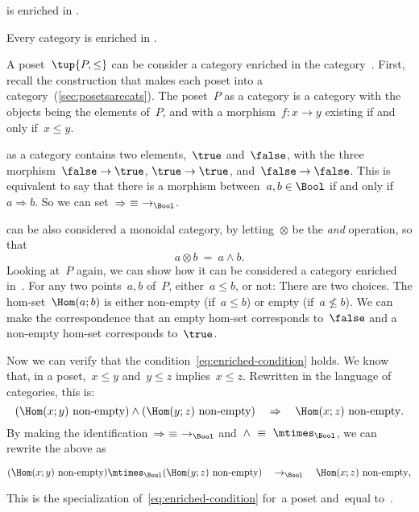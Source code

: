\begin{example}
  \Category is enriched in \Category.
\end{example}

\begin{example}
  Every category is enriched in \Set.
\end{example}


\begin{example}
  A poset~$\tup{P, \leq}$ can be consider a category enriched in the
  category~\Bool. First, recall the construction that makes each poset into a
  category~(\cref{sec:posetsarecats}). The poset~$P$ as a category is a category with the objects being the
  elements of~$P$, and with a morphism~$f\colon x \to y$ existing if and only if~$x\leq y$.

  \Bool as a category contains two elements,~$\true$ and~$\false$, with
  the three morphism~$\false \to \true$, $\true \to \true$, and~$\false \to \false$. This is equivalent to say that there is a morphism between~$a, b \in \Bool$ if and only if~$a \Rightarrow b$. So we can set~$\Rightarrow\ \equiv\ \to_{\Bool}$.

  \Bool can be also considered a monoidal category, by letting~$\otimes$ be
  the \emph{and} operation, so that
  \begin{equation}
    a \otimes b\ =\ a \wedge b.
  \end{equation}
  Looking at~$P$ again, we can show how it can be considered a category enriched in~\Bool. For any two points~$a, b$ of~$P$, either~$a \leq b$, or not: There are two choices. The hom-set~$\Hom(a; b)$ is either non-empty
  (if~$a \leq b$) or empty (if~$a \not\leq b$). We can make the correspondence that an empty hom-set corresponds to~$\false$ and a non-empty hom-set corresponds to~$\true$.

  Now we can verify that the condition~\cref{eq:enriched-condition} holds. We
  know that, in a poset,~$x \leq y$ and~$y \leq z$ implies~$x \leq z$.
%
  Rewritten in the language of categories, this is:
  \begin{equation*}
  (\Hom(x;y)\ \text{non-empty})
    \wedge
    (\Hom(y; z)\ \text{non-empty})
    \quad
    \Rightarrow
    \quad
    \Hom(x; z)\ \text{non-empty}.
  \end{equation*}
  By making the identification~$\Rightarrow\ \equiv\ \to_{\Bool}$ and~$\wedge\ \equiv\ \mtimes_{\Bool}$, we can rewrite the above as
  \begin{widepar}
  \begin{equation*}
  (\Hom(x;y)\ \text{non-empty})
    \mtimes_{\Bool}
    (\Hom(y; z)\ \text{non-empty})
    \quad
    \to_{\Bool}
    \quad
    \Hom(x; z)\ \text{non-empty},
  \end{equation*}
  \end{widepar}
  This is the specialization of~\cref{eq:enriched-condition}
  for~\CatC a poset and~\CatD equal to~\Bool.
\end{example}

